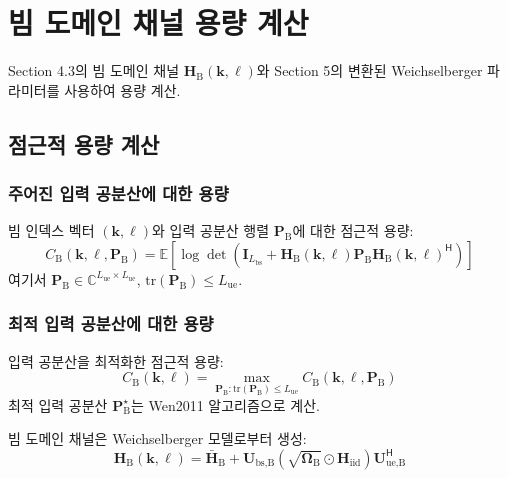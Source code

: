 \documentclass[10pt]{article}
\begin{document}
\newpage
\section{빔 도메인 채널 용량 계산}

Section 4.3의 빔 도메인 채널 $\mathbf{H}_{\text{B}}(\boldsymbol{k}, \boldsymbol{\ell})$와 Section 5의 변환된 Weichselberger 파라미터를 사용하여 용량 계산.

\subsection{점근적 용량 계산}

\subsubsection{주어진 입력 공분산에 대한 용량}
빔 인덱스 벡터 $(\boldsymbol{k}, \boldsymbol{\ell})$와 입력 공분산 행렬 $\mathbf{P}_{\text{B}}$에 대한 점근적 용량:
\begin{equation}
C_{\text{B}}(\boldsymbol{k}, \boldsymbol{\ell}, \mathbf{P}_{\text{B}}) = \mathbb{E}\left[\log \det\left(\mathbf{I}_{L_{\text{bs}}} + \mathbf{H}_{\text{B}}(\boldsymbol{k}, \boldsymbol{\ell}) \mathbf{P}_{\text{B}} \mathbf{H}_{\text{B}}(\boldsymbol{k}, \boldsymbol{\ell})^{\mathsf{H}}\right)\right]
\end{equation}
여기서 $\mathbf{P}_{\text{B}} \in \mathbb{C}^{L_{\text{ue}} \times L_{\text{ue}}}$, $\text{tr}(\mathbf{P}_{\text{B}}) \leq L_{\text{ue}}$.

\subsubsection{최적 입력 공분산에 대한 용량}
입력 공분산을 최적화한 점근적 용량:
\begin{equation}
C_{\text{B}}(\boldsymbol{k}, \boldsymbol{\ell}) = \max_{\mathbf{P}_{\text{B}}: \text{tr}(\mathbf{P}_{\text{B}}) \leq L_{\text{ue}}} C_{\text{B}}(\boldsymbol{k}, \boldsymbol{\ell}, \mathbf{P}_{\text{B}})
\end{equation}
최적 입력 공분산 $\mathbf{P}_{\text{B}}^{\star}$는 Wen2011 알고리즘으로 계산.

빔 도메인 채널은 Weichselberger 모델로부터 생성:
\begin{equation}
\mathbf{H}_{\text{B}}(\boldsymbol{k}, \boldsymbol{\ell}) = \bar{\mathbf{H}}_{\text{B}} + \mathbf{U}_{\text{bs,B}} \left(\sqrt{\boldsymbol{\Omega}_{\text{B}}} \odot \mathbf{H}_{\text{iid}}\right) \mathbf{U}_{\text{ue,B}}^{\mathsf{H}}
\end{equation}
\end{document}
